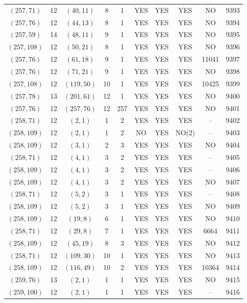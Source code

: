 \begin{longtable}{|c|c|c|c|c|c|c|c|c|c|}
$(257, 71)$ & 12 & $(40, 11)$ & 8 & 1 & YES & YES & YES & NO & 9393\\
$(257, 76)$ & 12 & $(44, 13)$ & 8 & 1 & YES & YES & YES & NO & 9394\\
$(257, 59)$ & 14 & $(48, 11)$ & 9 & 1 & YES & YES & YES & NO & 9395\\
$(257, 108)$ & 12 & $(50, 21)$ & 8 & 1 & YES & YES & YES & NO & 9396\\
$(257, 76)$ & 12 & $(61, 18)$ & 9 & 1 & YES & YES & YES & 11041 & 9397\\
$(257, 76)$ & 12 & $(71, 21)$ & 9 & 1 & YES & YES & YES & NO & 9398\\
$(257, 108)$ & 12 & $(119, 50)$ & 10 & 1 & YES & YES & YES & 10425 & 9399\\
$(257, 78)$ & 13 & $(201, 61)$ & 12 & 1 & YES & YES & YES & NO & 9400\\
$(257, 76)$ & 12 & $(257, 76)$ & 12 & 257 & YES & YES & YES & NO & 9401\\
$(258, 71)$ & 12 & $(2, 1)$ & 1 & 2 & YES & YES & YES & -- & 9402\\
$(258, 109)$ & 12 & $(2, 1)$ & 1 & 2 & NO & YES & NO(2) & -- & 9403\\
$(258, 109)$ & 12 & $(3, 1)$ & 2 & 3 & YES & YES & YES & NO & 9404\\
$(258, 71)$ & 12 & $(4, 1)$ & 3 & 2 & YES & YES & YES & -- & 9405\\
$(258, 109)$ & 12 & $(4, 1)$ & 3 & 2 & YES & YES & YES & -- & 9406\\
$(258, 109)$ & 12 & $(4, 1)$ & 3 & 2 & YES & YES & YES & NO & 9407\\
$(258, 71)$ & 12 & $(5, 2)$ & 3 & 1 & YES & YES & YES & -- & 9408\\
$(258, 109)$ & 12 & $(5, 2)$ & 3 & 1 & YES & YES & YES & NO & 9409\\
$(258, 109)$ & 12 & $(19, 8)$ & 6 & 1 & YES & YES & YES & NO & 9410\\
$(258, 71)$ & 12 & $(29, 8)$ & 7 & 1 & YES & YES & YES & 6664 & 9411\\
$(258, 109)$ & 12 & $(45, 19)$ & 8 & 3 & YES & YES & YES & NO & 9412\\
$(258, 71)$ & 12 & $(109, 30)$ & 10 & 1 & YES & YES & YES & NO & 9413\\
$(258, 109)$ & 12 & $(116, 49)$ & 10 & 2 & YES & YES & YES & 10364 & 9414\\
$(259, 76)$ & 13 & $(2, 1)$ & 1 & 1 & YES & YES & YES & NO & 9415\\
$(259, 100)$ & 12 & $(2, 1)$ & 1 & 1 & YES & YES & YES & -- & 9416\\

\end{longtable}

